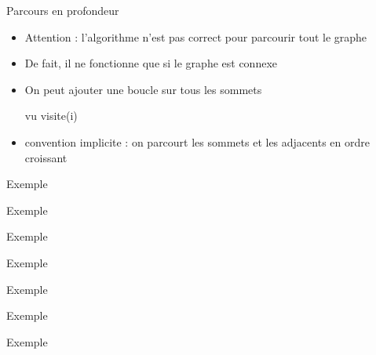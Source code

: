 
\begin{frame}{Parcours en profondeur}
    \begin{itemize}
        \item Attention : l'algorithme n'est pas correct pour parcourir tout le graphe
        \item De fait, il ne fonctionne que si le graphe est connexe 
        \pause 
        \item On peut ajouter une boucle sur tous les sommets 
        \pause 
        \begin{algorithm}[H]
            \begin{algorithmic}[1]
                \State vu 
                        \State visite(i)
                    \EndIf
                \EndFor
             \end{algorithmic}
            \caption{Parcours en profondeur}
            \label{alg:prof:alg}
            \end{algorithm}
        \pause 
        \item convention implicite : on parcourt les sommets et les adjacents en ordre croissant
    \end{itemize}
\end{frame}

\begin{frame}{Exemple}
    \begin{center}
        
    \end{center}
\end{frame}
\begin{frame}{Exemple}
    \begin{center}
        
    \end{center}
\end{frame}
\begin{frame}{Exemple}
    \begin{center}
        
    \end{center}
\end{frame}
\begin{frame}{Exemple}
    \begin{center}
        
    \end{center}
\end{frame}
\begin{frame}{Exemple}
    \begin{center}
        
    \end{center}
\end{frame}
\begin{frame}{Exemple}
    \begin{center}
        
    \end{center}
\end{frame}
\begin{frame}{Exemple}
    \begin{center}
        
    \end{center}
\end{frame}

